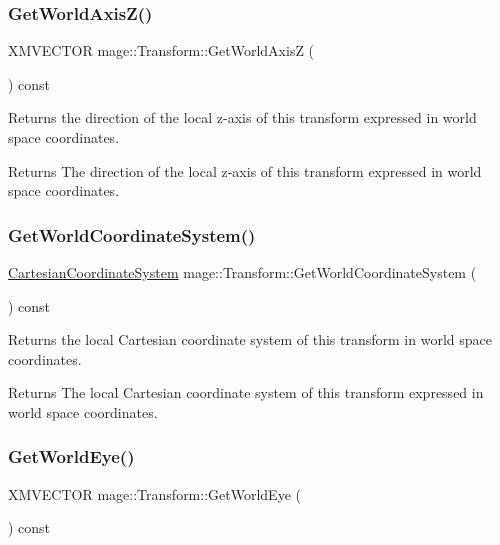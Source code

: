 \subsubsection{\texorpdfstring{Get\+World\+Axis\+Z()}{GetWorldAxisZ()}}
{\footnotesize\ttfamily X\+M\+V\+E\+C\+T\+OR mage\+::\+Transform\+::\+Get\+World\+AxisZ (\begin{DoxyParamCaption}{ }\end{DoxyParamCaption}) const}

Returns the direction of the local z-\/axis of this transform expressed in world space coordinates.

\begin{DoxyReturn}{Returns}
The direction of the local z-\/axis of this transform expressed in world space coordinates. 
\end{DoxyReturn}
\hypertarget{structmage_1_1_transform_a809600adbb284334d444ae8c50b17a1d}{}\label{structmage_1_1_transform_a809600adbb284334d444ae8c50b17a1d} 
\subsubsection{\texorpdfstring{Get\+World\+Coordinate\+System()}{GetWorldCoordinateSystem()}}
{\footnotesize\ttfamily \hyperlink{structmage_1_1_cartesian_coordinate_system}{Cartesian\+Coordinate\+System} mage\+::\+Transform\+::\+Get\+World\+Coordinate\+System (\begin{DoxyParamCaption}{ }\end{DoxyParamCaption}) const}

Returns the local Cartesian coordinate system of this transform in world space coordinates.

\begin{DoxyReturn}{Returns}
The local Cartesian coordinate system of this transform expressed in world space coordinates. 
\end{DoxyReturn}
\hypertarget{structmage_1_1_transform_a41ba0976f707bc9bcfa646e53d7e9507}{}\label{structmage_1_1_transform_a41ba0976f707bc9bcfa646e53d7e9507} 
\subsubsection{\texorpdfstring{Get\+World\+Eye()}{GetWorldEye()}}
{\footnotesize\ttfamily X\+M\+V\+E\+C\+T\+OR mage\+::\+Transform\+::\+Get\+World\+Eye (\begin{DoxyParamCaption}{ }\end{DoxyParamCaption}) const}

